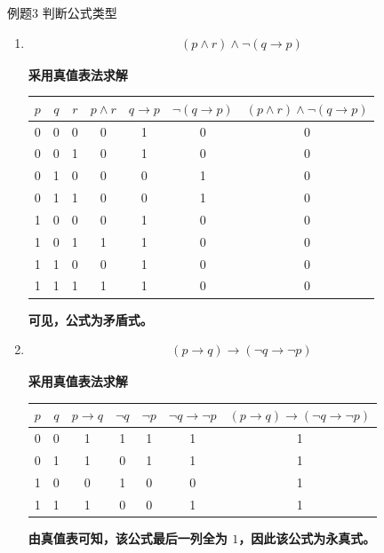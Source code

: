 \begin{question}{例题3}
	判断公式类型
	
	\begin{enumerate}
		\item 
		\begin{align*}
			(p \land r) \land \neg(q \to p)
		\end{align*}
		
		\textbf{采用真值表法求解}
		\begin{center}
			\begin{tabular}{ccccccc}
				\toprule
				$p$ & $q$ & $r$ & $p \land r$ & $q \to p$ & $\neg(q \to p)$ & $(p \land r)\land\neg(q \to p)$ \\
				\midrule
				0 & 0 & 0 & 0 & 1 & 0 & 0 \\
				0 & 0 & 1 & 0 & 1 & 0 & 0 \\
				0 & 1 & 0 & 0 & 0 & 1 & 0 \\
				0 & 1 & 1 & 0 & 0 & 1 & 0 \\
				1 & 0 & 0 & 0 & 1 & 0 & 0 \\
				1 & 0 & 1 & 1 & 1 & 0 & 0 \\
				1 & 1 & 0 & 0 & 1 & 0 & 0 \\
				1 & 1 & 1 & 1 & 1 & 0 & 0 \\
				\bottomrule
			\end{tabular}
		\end{center}
		
		\textbf{可见，公式为矛盾式。}
		
		
		\item 
		\begin{align*}
			(p \to q) \to (\neg q \to \neg p)
		\end{align*}
		
		\textbf{采用真值表法求解}
		\begin{center}
			\begin{tabular}{ccccccc}
				\toprule
				$p$ & $q$ & $p\to q$ & $\neg q$ & $\neg p$ & $\neg q\to \neg p$ & $(p\to q)\to(\neg q\to\neg p)$ \\
				\midrule
				0 & 0 & 1 & 1 & 1 & 1 & 1 \\
				0 & 1 & 1 & 0 & 1 & 1 & 1 \\
				1 & 0 & 0 & 1 & 0 & 0 & 1 \\
				1 & 1 & 1 & 0 & 0 & 1 & 1 \\
				\bottomrule
			\end{tabular}
		\end{center}
		
		\textbf{由真值表可知，该公式最后一列全为 $1$，因此该公式为永真式。}
		

\end{enumerate}
\end{question}
